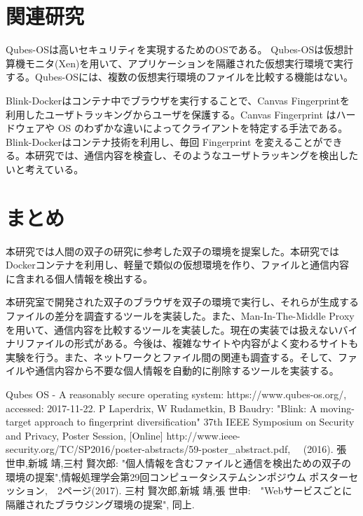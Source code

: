 \documentclass[a4paper,twocolumn,10pt]{jarticle}
\begin{document}
\section{関連研究}
Qubes-OS\cite{qubes}は高いセキュリティを実現するためのOSである。 Qubes-OSは仮想計算機モニタ(Xen)を用いて、アプリケーションを隔離された仮想実行環境で実行する。Qubes-OSには、複数の仮想実行環境のファイルを比較する機能はない。

Blink-Docker\cite{blink}はコンテナ中でブラウザを実行することで、Canvas Fingerprintを利用したユーザトラッキングからユーザを保護する。Canvas Fingerprint はハードウェアや OS のわずかな違いによってクライアントを特定する手法である。Blink-Dockerはコンテナ技術を利用し、毎回 Fingerprint を変えることができる。本研究では、通信内容を検査し、そのようなユーザトラッキングを検出したいと考えている。



\section{まとめ}
本研究では人間の双子の研究に参考した双子の環境を提案した。本研究ではDockerコンテナを利用し、軽量で類似の仮想環境を作り、ファイルと通信内容に含まれる個人情報を検出する。

本研究室で開発された双子のブラウザを双子の環境で実行し、それらが生成するファイルの差分を調査するツールを実装した。また、Man-In-The-Middle Proxyを用いて、通信内容を比較するツールを実装した。現在の実装では扱えないバイナリファイルの形式がある。今後は、複雑なサイトや内容がよく変わるサイトも実験を行う。また、ネットワークとファイル間の関連も調査する。そして、ファイルや通信内容から不要な個人情報を自動的に削除するツールを実装する。



\begin{thebibliography}{1}

 {\small Qubes OS - A reasonably secure operating system: https://www.qubes-os.org/, accessed: 2017-11-22.}
 P Laperdrix, W Rudametkin, B Baudry: "Blink: A moving-target approach to fingerprint diversification" 37th IEEE Symposium on Security and Privacy, Poster Session, [Online]
http://www.ieee-security.org/TC/SP2016/poster-abstracts/59-poster\_abstract.pdf, 　(2016).
張 世申,新城 靖,三村 賢次郎: "個人情報を含むファイルと通信を検出ための双子の環境の提案",情報処理学会第29回コンピュータシステムシンポジウム ポスターセッション,　2ページ(2017).
三村 賢次郎,新城 靖,張 世申:　"Webサービスごとに隔離されたブラウジング環境の提案", 同上.
\end{thebibliography}
\end{document}
